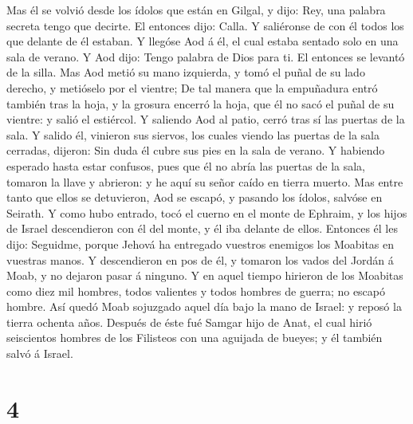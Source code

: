  Mas él se volvió desde los ídolos que están en Gilgal, y
dijo: Rey, una palabra secreta tengo que decirte. El entonces dijo:
Calla. Y saliéronse de con él todos los que delante de él estaban.
 Y llegóse Aod á él, el cual estaba sentado solo en una
sala de verano. Y Aod dijo: Tengo palabra de Dios para ti. El entonces
se levantó de la silla.  Mas Aod metió su mano izquierda, y
tomó el puñal de su lado derecho, y metióselo por el vientre;
 De tal manera que la empuñadura entró también tras la
hoja, y la grosura encerró la hoja, que él no sacó el puñal de su
vientre: y salió el estiércol.  Y saliendo Aod al patio,
cerró tras sí las puertas de la sala.  Y salido él,
vinieron sus siervos, los cuales viendo las puertas de la sala cerradas,
dijeron: Sin duda él cubre sus pies en la sala de verano. 
Y habiendo esperado hasta estar confusos, pues que él no abría las
puertas de la sala, tomaron la llave y abrieron: y he aquí su señor
caído en tierra muerto.  Mas entre tanto que ellos se
detuvieron, Aod se escapó, y pasando los ídolos, salvóse en Seirath.
 Y como hubo entrado, tocó el cuerno en el monte de
Ephraim, y los hijos de Israel descendieron con él del monte, y él iba
delante de ellos.  Entonces él les dijo: Seguidme, porque
Jehová ha entregado vuestros enemigos los Moabitas en vuestras manos. Y
descendieron en pos de él, y tomaron los vados del Jordán á Moab, y no
dejaron pasar á ninguno.  Y en aquel tiempo hirieron de los
Moabitas como diez mil hombres, todos valientes y todos hombres de
guerra; no escapó hombre.  Así quedó Moab sojuzgado aquel
día bajo la mano de Israel: y reposó la tierra ochenta años.
 Después de éste fué Samgar hijo de Anat, el cual hirió
seiscientos hombres de los Filisteos con una aguijada de bueyes; y él
también salvó á Israel.

\hypertarget{section-3}{%
\section{4}\label{section-3}}

